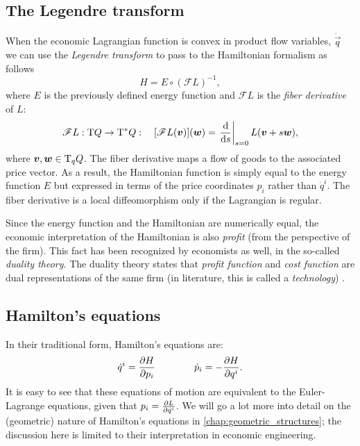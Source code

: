\subsection{The Legendre transform} 
When the economic Lagrangian function is convex in product flow variables, \(\dot{\vec{q}}\) we can use the \emph{Legendre transform} to pass to the Hamiltonian formalism as follows \cite{Abraham1978}
\begin{equation}
    H = E \circ (\mathscr{F}L)^{-1},
\end{equation}
where \(E\) is the previously defined energy function and \(\mathscr{F}L\) is the \emph{fiber derivative} of \(L\): \cite{Marsden1998}
\begin{equation}
    \mathscr{F}L: \tbundle{Q} \to \ctbundle{Q}: \quad [\mathscr{F}L(\vec{v})](\vec{w}) = \left .\dv{}{s}\right|_{s = 0} L(\vec{v} + s\vec{w}),
\end{equation}
where \(\vec{v}, \vec{w} \in \tspace{q}{Q}\). The fiber derivative maps a flow of goods to the associated price vector. As a result, the Hamiltonian function is simply equal to the energy function \(E\) but expressed in terms of the price coordinates \(p_i\) rather than \(\dot{q}^i\). The fiber derivative is a local diffeomorphism only if the Lagrangian is regular.

Since the energy function and the Hamiltonian are numerically equal, the economic interpretation of the Hamiltonian is also \emph{profit} (from the perspective of the firm). This fact has been recognized by economists as well, in the so-called \emph{duality theory}. The duality theory states that \emph{profit function} and \emph{cost function} are dual representations of the same firm (in literature, this is called a \emph{technology}) \cite{blume2020,varianhalr1992}.

\subsection{Hamilton's equations} 
In their traditional form, Hamilton's equations are:
\begin{equation}
    \dot{q}^i = \pdv{H}{p_i} \qquad \qquad \dot{p}_i = -\pdv{H}{q^i}.
\end{equation}
It is easy to see that these equations of motion are equivalent to the Euler-Lagrange equations, given that \(p_i = \pdv{L}{\dot{q}^i}\). We will go a lot more into detail on the (geometric) nature of Hamilton's equations in \cref{chap:geometric_structures}; the discussion here is limited to their interpretation in economic engineering.

